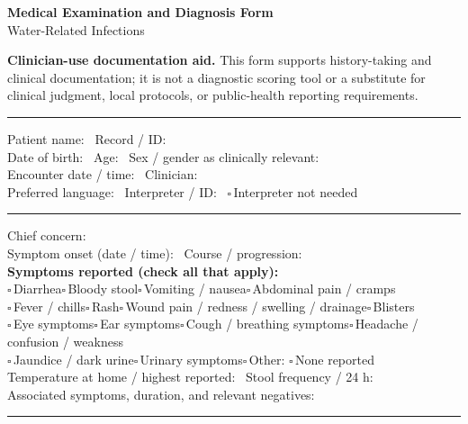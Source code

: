 \documentclass[10pt,a4paper]{article}
\newcommand{\boxx}{\ensuremath{\square}}
\newcommand{\checkitem}[1]{\boxx\,#1\quad}
\newcommand{\linefield}[2]{#1\ \underline{\hspace{#2}}}
\newcommand{\writearea}[1]{\vspace{1pt}\par\noindent\rule{\linewidth}{0.35pt}\par\vspace{#1}}
\newcommand{\sectionbar}[1]{\vspace{3pt}{\large\bfseries #1}\par\vspace{1pt}\hrule\vspace{3pt}}
\begin{document}
\begin{center}
  {\LARGE\bfseries Medical Examination and Diagnosis Form}\\[-1pt]
  {\large Water-Related Infections}
\end{center}
\small
\textbf{Clinician-use documentation aid.} This form supports history-taking and clinical documentation; it is not a diagnostic scoring tool or a substitute for clinical judgment, local protocols, or public-health reporting requirements.

\sectionbar{1. Patient and encounter}
\linefield{Patient name:}{7.0cm} \linefield{Record / ID:}{3.2cm}\\
\linefield{Date of birth:}{3.0cm} \linefield{Age:}{1.5cm} \linefield{Sex / gender as clinically relevant:}{4.2cm}\\
\linefield{Encounter date / time:}{4.0cm} \linefield{Clinician:}{5.0cm}\\
\linefield{Preferred language:}{4.0cm} \linefield{Interpreter / ID:}{4.0cm} \checkitem{Interpreter not needed}

\sectionbar{2. Presenting illness}
\linefield{Chief concern:}{12.5cm}\\
\linefield{Symptom onset (date / time):}{4.5cm} \linefield{Course / progression:}{6.0cm}\\
\textbf{Symptoms reported (check all that apply):}\\
\checkitem{Diarrhea}\checkitem{Bloody stool}\checkitem{Vomiting / nausea}\checkitem{Abdominal pain / cramps}\\
\checkitem{Fever / chills}\checkitem{Rash}\checkitem{Wound pain / redness / swelling / drainage}\checkitem{Blisters}\\
\checkitem{Eye symptoms}\checkitem{Ear symptoms}\checkitem{Cough / breathing symptoms}\checkitem{Headache / confusion / weakness}\\
\checkitem{Jaundice / dark urine}\checkitem{Urinary symptoms}\checkitem{Other:}\underline{\hspace{4.8cm}} \checkitem{None reported}\\
\linefield{Temperature at home / highest reported:}{5.0cm} \linefield{Stool frequency / 24 h:}{3.8cm}\\
\linefield{Associated symptoms, duration, and relevant negatives:}{8.3cm}
\writearea{5mm}
\end{document}

